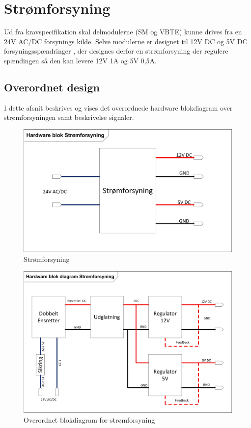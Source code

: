 \chapter{Strømforsyning}
Ud fra kravspecifikation skal delmodulerne (SM og VBTE) kunne drives fra en 24V AC/DC forsynings kilde. Selve modulerne er designet til 12V DC og 5V DC forsyningsspændringer , der designes derfor en strømforsyning der regulere spændingen så den kan levere 12V 1A og 5V 0,5A.  

\section{Overordnet design}
I dette afsnit beskrives og vises det overordnede hardware blokdiagram over strømforsyningen samt beskrivelse signaler.
\begin{figure}[H]
\centering
\includegraphics[scale=0.6]{billeder/PowerSupply}
\caption{Strømforsyning}
\label{fig:PowerSubbly}
\end{figure}
\begin{figure}[H]
\centering
\includegraphics[scale=0.8]{billeder/PowerSupplyBlok}
\caption{Overordnet blokdiagram for strømforsyning}
\label{fig:PowerSubbly Blok}
\end{figure}
\newpage
